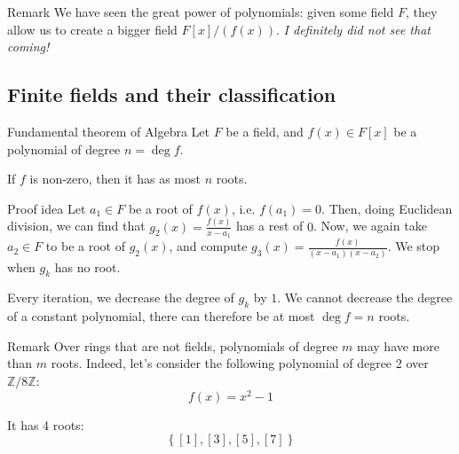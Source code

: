 \documentclass[a4paper]{article}
\begin{document}
\begin{parag}{Remark}
    We have seen the great power of polynomials: given some field $F$, they allow us to create a bigger field $F\left[x\right] / \left(f\left(x\right)\right)$. \textit{I definitely did not see that coming!}
\end{parag}

\subsection{Finite fields and their classification}

\begin{parag}{Fundamental theorem of Algebra}
    Let $F$ be a field, and $f\left(x\right) \in F\left[x\right]$ be a polynomial of degree $n = \deg f$.

    If $f$ is non-zero, then it has as most $n$ roots.

    \begin{subparag}{Proof idea}
         Let $a_1 \in F$ be a root of $f\left(x\right)$, i.e. $f\left(a_1\right) = 0$. Then, doing Euclidean division, we can find that $g_2\left(x\right) = \frac{f\left(x\right)}{x - a_1}$ has a rest of $0$. Now, we again take $a_2 \in F$ to be a root of $g_2\left(x\right)$, and compute $g_3\left(x\right) = \frac{f\left(x\right)}{\left(x - a_1\right)\left(x - a_2\right)}$. We stop when $g_k$ has no root.

        Every iteration, we decrease the degree of $g_k$ by $1$. We cannot decrease the degree of a constant polynomial, there can therefore be at most $\deg f = n$ roots.
    \end{subparag}

    \begin{subparag}{Remark}
        Over rings that are not fields, polynomials of degree $m$ may have more than $m$ roots. Indeed, let's consider the following polynomial of degree 2 over $\mathbb{Z}/8\mathbb{Z}$: 
        \[f\left(x\right) = x^2 - 1\]
        
        It has 4 roots: 
        \[\left\{\left[1\right], \left[3\right], \left[5\right], \left[7\right]\right\}\]
    \end{subparag}
\end{parag}
\end{document}
